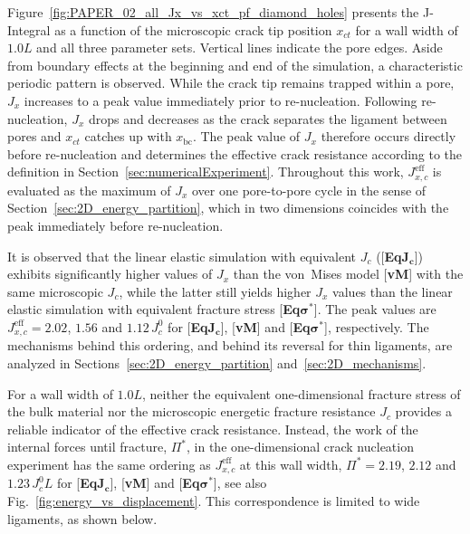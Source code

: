 \documentclass[pdflatex,sn-mathphys-num]{sn-jnl}%
\newcommand{\vMLabel}{[\textbf{vM}]\xspace}
\newcommand{\EqJcLabel}{[\textbf{Eq$\boldsymbol{J_c}$}]\xspace}
\newcommand{\EqSigmaStarLabel}{[\textbf{Eq$\boldsymbol{\sigma^*}$}]\xspace}
\theoremstyle{thmstyleone}%
\theoremstyle{thmstyletwo}%
\theoremstyle{thmstylethree}%
\begin{document}
Figure~\ref{fig:PAPER_02_all_Jx_vs_xct_pf_diamond_holes} presents the J-Integral as a function of the microscopic crack tip position $x_{ct}$ for a wall width of $1.0L$ and all three parameter sets. Vertical lines indicate the pore edges. Aside from boundary effects at the beginning and end of the simulation, a characteristic periodic pattern is observed. While the crack tip remains trapped within a pore, $J_x$ increases to a peak value immediately prior to re-nucleation. Following re-nucleation, $J_x$ drops and decreases as the crack separates the ligament between pores and $x_{ct}$ catches up with $x_{\text{bc}}$. The peak value of $J_x$ therefore occurs directly before re-nucleation and determines the effective crack resistance according to the definition in Section~\ref{sec:numericalExperiment}. Throughout this work, $J_{x,c}^{\text{eff}}$ is evaluated as the maximum of $J_x$ over one pore-to-pore cycle in the sense of Section~\ref{sec:2D_energy_partition}, which in two dimensions coincides with the peak immediately before re-nucleation.

It is observed that the linear elastic simulation with equivalent $J_c$ (\EqJcLabel) exhibits significantly higher values of $J_x$ than the von~Mises model \vMLabel with the same microscopic $J_c$, while the latter still yields higher $J_x$ values than the linear elastic simulation with equivalent fracture stress \EqSigmaStarLabel. The peak values are $J_{x,c}^{\text{eff}} = 2.02$, $1.56$ and $1.12\,J_c^0$ for \EqJcLabel, \vMLabel and \EqSigmaStarLabel, respectively. The mechanisms behind this ordering, and behind its reversal for thin ligaments, are analyzed in Sections~\ref{sec:2D_energy_partition} and~\ref{sec:2D_mechanisms}.

For a wall width of $1.0L$, neither the equivalent one-dimensional fracture stress of the bulk material nor the microscopic energetic fracture resistance $J_c$ provides a reliable indicator of the effective crack resistance. Instead, the work of the internal forces until fracture, $\Pi^*$, in
the one-dimensional crack nucleation experiment has the same ordering as $J_{x,c}^{\text{eff}}$ at this wall width, $\Pi^* = 2.19$, $2.12$ and $1.23\,J_c^0L$ for \EqJcLabel, \vMLabel and \EqSigmaStarLabel, see also Fig.~\ref{fig:energy_vs_displacement}. This correspondence is limited to wide ligaments, as shown below.
\end{document}

